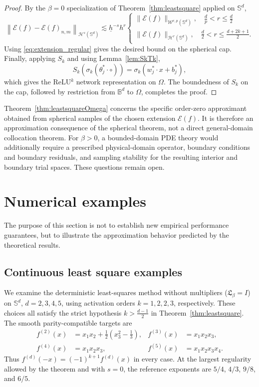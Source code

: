 \documentclass{article}
\numberwithin{equation}{section}
\def\BB{\mathbb{B}}
\begin{document}
\begin{proof}
By the $\beta=0$ specialization of Theorem~\ref{thm:leastsquare} applied on $\mathbb S^d$,
\[
\left\|
\mathcal{E}(f)-\mathcal{E}(f)_{n,m}
\right\|_{\mathcal H^s(\mathbb S^d)}\lesssim \underline h^{-s}h^r
\begin{cases}
\|\mathcal{E}(f)\|_{\mathcal W^{r,p}(\mathbb S^d)},\quad \frac dp<r\leq\frac{d}{2}\\
\|\mathcal{E}(f)\|_{\mathcal H^r(\mathbb S^d)},\quad\frac{d}{2}<r\leq\frac{d+2k+1}{2}.
\end{cases}
\]
Using \eqref{eq:extension_regular} gives the desired bound on the
spherical cap. Finally, applying $S_k$ and using Lemma~\ref{lem:SkTk},
\[
S_k
\left(
\sigma_k(\theta_j^*\cdot\circ)
\right)
=
\sigma_k(w_j^*\cdot x+b_j^*),
\]
which gives the ReLU$^k$ network representation on $\Omega$. The boundedness of $S_k$ on the cap, followed by restriction from $\BB^d$ to $\Omega$, completes the proof.
\end{proof}

Theorem~\ref{thm:leastsquareOmega} concerns the specific order-zero approximant obtained from spherical samples of the chosen extension $\mathcal E(f)$. It is therefore an approximation consequence of the spherical theorem, not a direct general-domain collocation theorem. For $\beta>0$, a bounded-domain PDE theory would additionally require a prescribed physical-domain operator, boundary conditions and boundary residuals, and sampling stability for the resulting interior and boundary trial spaces. These questions remain open.


\section{Numerical examples}\label{sec:numerical_experiments}
The purpose of this section is not to establish new empirical performance guarantees, but to illustrate the approximation behavior predicted by the theoretical results.


\subsection{Continuous least square examples}
We examine the deterministic least-squares method without multipliers ($\mathfrak L_\beta=I$) on \(\mathbb S^d\), \(d=2,3,4,5\), using activation orders \(k=1,2,2,3\), respectively. These choices all satisfy the strict hypothesis \(k>\frac{d-1}{2}\) in Theorem~\ref{thm:leastsquare}. The smooth parity-compatible targets are
\[
\begin{aligned}
 f^{(2)}(x)&=x_1x_2+\tfrac12(x_3^2-\tfrac13),&
 f^{(3)}(x)&=x_1x_2x_3,\\
 f^{(4)}(x)&=x_1x_2x_3,&
 f^{(5)}(x)&=x_1x_2x_3x_4 .
\end{aligned}
\]
Thus \(f^{(d)}(-x)=(-1)^{k+1}f^{(d)}(x)\) in every case. At the largest regularity allowed by the theorem and with \(s=0\), the reference exponents are \(5/4\), \(4/3\), \(9/8\), and \(6/5\).
\end{document}
